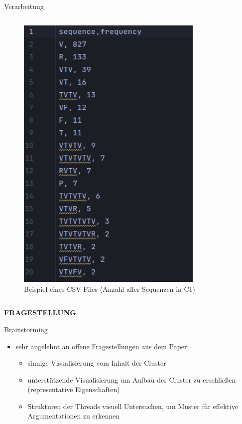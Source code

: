 \documentclass[compress,12pt]{beamer}
\begin{document}
\begin{frame}{Verarbeitung}
\begin{columns}
\begin{column}{0.5\textwidth}
\begin{figure}
                    \includegraphics[width=0.8\textwidth]{../images/csv-file-example}
                    \caption{Beispiel eines CSV Files (Anzahl aller Sequenzen in C1)}
                    \label{fig:csv-file-example}
                \end{figure}
            \end{column}
        \end{columns}
    \end{frame}

    \End

    \begin{frame}
        \centering
        \textbf{FRAGESTELLUNG}
    \end{frame}


    \begin{frame}{Brainstorming}
        \begin{itemize}
            \item sehr angelehnt an offene Fragestellungen aus dem Paper:
            \begin{itemize}
                \item sinnige Visualisierung vom Inhalt der Cluster
                \item unterstützende Visualisierung um Aufbau der Cluster zu erschließen (representative Eigenschaften)
                \item Strukturen der Threads visuell Untersuchen, um Muster für effektive Argumentationen zu erkennen
            \end{itemize}
        \end{itemize}
    \end{frame}
\end{document}
